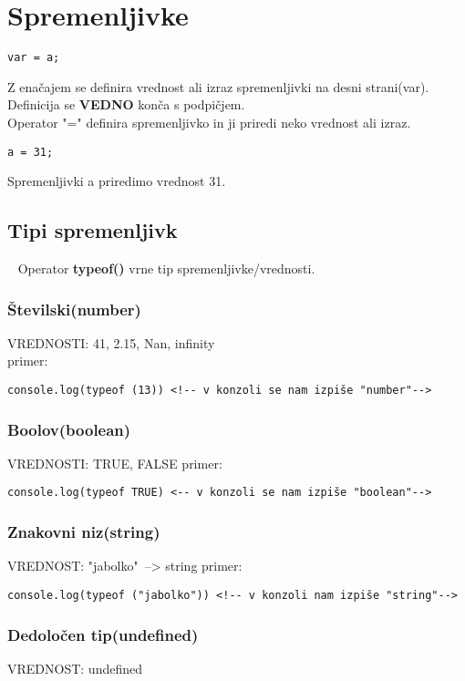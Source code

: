 \section{Spremenljivke}

\begin{verbatim}
var = a;
\end{verbatim}
Z enačajem se definira vrednost ali izraz spremenljivki na desni strani(var). Definicija se \textbf{VEDNO} konča s podpičjem.\\

Operator "=" definira spremenljivko in ji priredi neko vrednost ali izraz.

\texttt{a = 31;}

Spremenljivki a priredimo vrednost 31.\\

\subsection{Tipi spremenljivk}\
\newline
Operator \textbf{typeof()} vrne tip spremenljivke/vrednosti.\


\subsubsection*{Številski(number)}
VREDNOSTI: 41, 2.15, Nan, infinity\\
primer:
\begin{verbatim}
console.log(typeof (13)) <!-- v konzoli se nam izpiše "number"-->
\end{verbatim}

\subsubsection*{Boolov(boolean)}
VREDNOSTI: TRUE, FALSE
primer:
\begin{verbatim}
console.log(typeof TRUE) <-- v konzoli se nam izpiše "boolean"-->
\end{verbatim}

\subsubsection*{Znakovni niz(string)}
VREDNOST: "jabolko"\ --> string
primer:
\begin{verbatim}
console.log(typeof ("jabolko")) <!-- v konzoli nam izpiše "string"-->
\end{verbatim}

\subsubsection*{Dedoločen tip(undefined)}
VREDNOST: undefined

